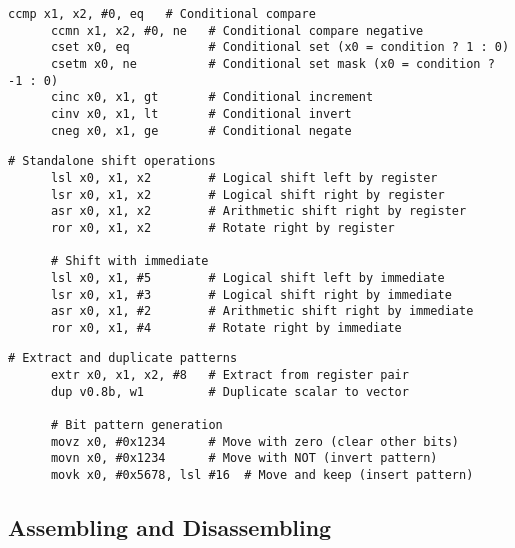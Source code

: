   \begin{definition}
    \begin{lstlisting}[language=arm]
      ccmp x1, x2, #0, eq   # Conditional compare
      ccmn x1, x2, #0, ne   # Conditional compare negative
      cset x0, eq           # Conditional set (x0 = condition ? 1 : 0)
      csetm x0, ne          # Conditional set mask (x0 = condition ? -1 : 0)
      cinc x0, x1, gt       # Conditional increment
      cinv x0, x1, lt       # Conditional invert
      cneg x0, x1, ge       # Conditional negate
    \end{lstlisting}
  \end{definition}

  \begin{definition}
    \begin{lstlisting}[language=arm]
      # Standalone shift operations
      lsl x0, x1, x2        # Logical shift left by register
      lsr x0, x1, x2        # Logical shift right by register
      asr x0, x1, x2        # Arithmetic shift right by register
      ror x0, x1, x2        # Rotate right by register
      
      # Shift with immediate
      lsl x0, x1, #5        # Logical shift left by immediate
      lsr x0, x1, #3        # Logical shift right by immediate
      asr x0, x1, #2        # Arithmetic shift right by immediate
      ror x0, x1, #4        # Rotate right by immediate
    \end{lstlisting}
  \end{definition}

  \begin{definition}
    \begin{lstlisting}[language=arm]
      # Extract and duplicate patterns
      extr x0, x1, x2, #8   # Extract from register pair
      dup v0.8b, w1         # Duplicate scalar to vector
      
      # Bit pattern generation
      movz x0, #0x1234      # Move with zero (clear other bits)
      movn x0, #0x1234      # Move with NOT (invert pattern)
      movk x0, #0x5678, lsl #16  # Move and keep (insert pattern)
    \end{lstlisting}
  \end{definition}

\subsection{Assembling and Disassembling} 

